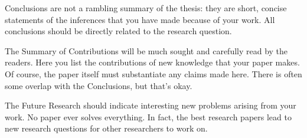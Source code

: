 \documentclass[11pt]{article}       %
\begin{document}
Conclusions are not a rambling summary of the thesis: they are short, concise statements of the inferences that you have made because of your work. All conclusions should be directly related to the research question.

The Summary of Contributions will be much sought and carefully read by the readers. Here you list the contributions of new knowledge that your paper makes. Of course, the paper itself must substantiate any claims made here. There is often some overlap with the Conclusions, but that’s okay.

The Future Research should indicate interesting new problems arising from your work. No paper ever solves everything. In fact, the best research papers lead to new research questions for other researchers to work on.




\end{document}
